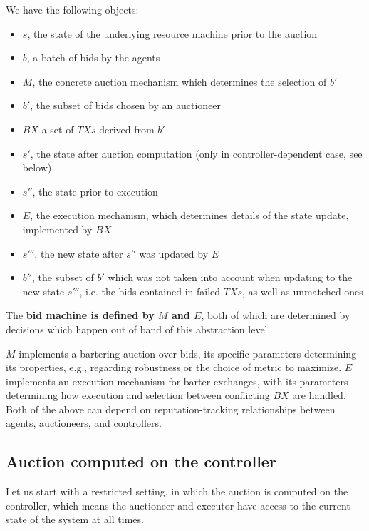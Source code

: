 We have the following objects:
\begin{itemize}
    \item $s$, the state of the underlying resource machine prior to the auction
    \item $b$, a batch of bids by the agents
    \item $M$, the concrete auction mechanism which determines the selection of $b'$
    \item $b'$, the subset of bids chosen by an auctioneer
    \item $BX$ a set of $TXs$ derived from $b'$
    \item $s'$, the state after auction computation (only in controller-dependent case, see below)
    \item $s''$, the state prior to execution
    \item $E$, the execution mechanism, which determines details of the state update, implemented by $BX$
    \item $s'''$, the new state after $s''$ was updated by $E$
    \item $b''$, the subset of $b'$ which was not taken into account when updating to the new state $s'''$, i.e. the bids contained in failed $TXs$, as well as unmatched ones
\end{itemize}

The \textbf{bid machine is defined by $M$ and $E$}, both of which are determined by decisions which happen out of band of this abstraction level.

$M$ implements a bartering auction over bids, its specific parameters determining its properties, e.g., regarding robustness or the choice of metric to maximize. 
$E$ implements an execution mechanism for barter exchanges, with its parameters determining how execution and selection between conflicting $BX$ are handled.
Both of the above can depend on reputation-tracking relationships between agents, auctioneers, and controllers.

\subsection{Auction computed on the controller}\label{sec:controller-dependent-auction}

Let us start with a restricted setting, in which the auction is computed on the controller, which means the auctioneer and executor have access to the current state of the system at all times. 

